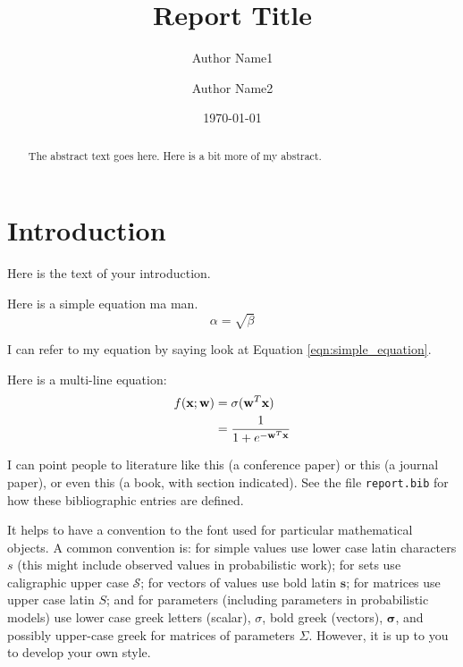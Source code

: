 \documentclass[11point]{article}
\renewcommand{\vec}[1]{\boldsymbol{\mathbf{#1}}}
\newcommand{\datapoint}{\vec{x}}
\newcommand{\weights}{\vec{w}}
\begin{document}
\title{Report Title}
\author[*]{Author Name1}
\author[**]{Author Name2}
\date{\today}

\maketitle

\begin{abstract}
The abstract text goes here. Here is a bit more of my abstract.
\end{abstract}

\section{Introduction}
\label{sec:intro}
Here is the text of your introduction.

Here is a simple equation ma man.
\begin{equation}
    \label{eqn:simple_equation}
    \alpha = \sqrt{ \beta }
\end{equation}

I can refer to my equation by saying look at Equation \eqref{eqn:simple_equation}.

Here is a multi-line equation:
\begin{align}
f(\datapoint; \weights)
& = \sigma(\weights^T\datapoint)
\label{eqn:logistic_regresion_decision_function} %
\\ %
& = \frac{1}{1+e^{-\weights^T\datapoint}}
\notag %
\end{align}

I can point people to literature like this \cite{Mikolov2013} (a conference paper) or this \cite{Fawcett2006} (a journal paper), or even this \cite[Sec. 4.1]{Bishop2006} (a book, with section indicated). See the file \texttt{report.bib} for how these bibliographic entries are defined.

It helps to have a convention to the font used for particular mathematical objects. A common convention is: for simple values use lower case latin characters $s$ (this might include observed values in probabilistic work); for sets use caligraphic upper case $\mathcal{S}$; for vectors of values use bold latin $\vec{s}$; for matrices use upper case latin $S$; and for parameters (including parameters in probabilistic models) use lower case greek letters (scalar), $\sigma$, bold greek (vectors), $\vec{\sigma}$, and possibly upper-case greek for matrices of parameters $\Sigma$. However, it is up to you to develop your own style.
\end{document}

